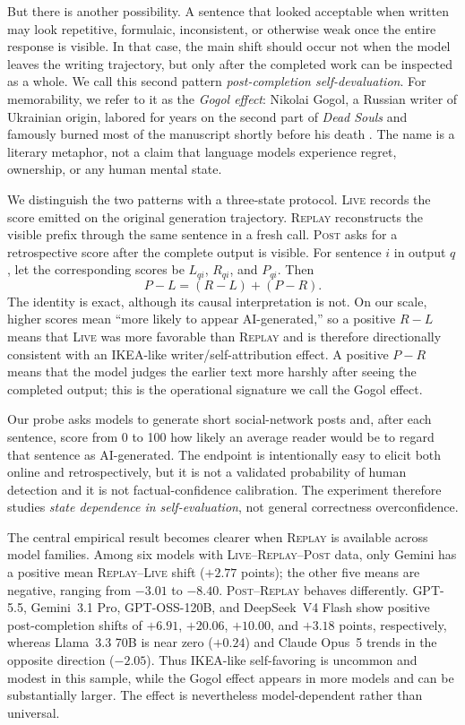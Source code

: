 \documentclass[10pt]{article}
\newcommand{\live}{\textsc{Live}}
\newcommand{\replay}{\textsc{Replay}}
\newcommand{\post}{\textsc{Post}}
\begin{document}
But there is another possibility. A sentence that looked acceptable when written may look repetitive, formulaic, inconsistent, or otherwise weak once the entire response is visible. In that case, the main shift should occur not when the model leaves the writing trajectory, but only after the completed work can be inspected as a whole. We call this second pattern \emph{post-completion self-devaluation}. For memorability, we refer to it as the \emph{Gogol effect}: Nikolai Gogol, a Russian writer of Ukrainian origin, labored for years on the second part of \emph{Dead Souls} and famously burned most of the manuscript shortly before his death \citep{gogolbio}. The name is a literary metaphor, not a claim that language models experience regret, ownership, or any human mental state.

We distinguish the two patterns with a three-state protocol. \live{} records the score emitted on the original generation trajectory. \replay{} reconstructs the visible prefix through the same sentence in a fresh call. \post{} asks for a retrospective score after the complete output is visible. For sentence $i$ in output $q$, let the corresponding scores be $L_{qi}$, $R_{qi}$, and $P_{qi}$. Then
\begin{equation}
P-L=(R-L)+(P-R).
\label{eq:decomp}
\end{equation}
The identity is exact, although its causal interpretation is not. On our scale, higher scores mean ``more likely to appear AI-generated,'' so a positive $R-L$ means that \live{} was more favorable than \replay{} and is therefore directionally consistent with an IKEA-like writer/self-attribution effect. A positive $P-R$ means that the model judges the earlier text more harshly after seeing the completed output; this is the operational signature we call the Gogol effect.

Our probe asks models to generate short social-network posts and, after each sentence, score from 0 to 100 how likely an average reader would be to regard that sentence as AI-generated. The endpoint is intentionally easy to elicit both online and retrospectively, but it is not a validated probability of human detection and it is not factual-confidence calibration. The experiment therefore studies \emph{state dependence in self-evaluation}, not general correctness overconfidence.

The central empirical result becomes clearer when \replay{} is available across model families. Among six models with \live{}--\replay{}--\post{} data, only Gemini has a positive mean \replay{}--\live{} shift ($+2.77$ points); the other five means are negative, ranging from $-3.01$ to $-8.40$. \post{}--\replay{} behaves differently. GPT-5.5, Gemini~3.1 Pro, GPT-OSS-120B, and DeepSeek~V4 Flash show positive post-completion shifts of $+6.91$, $+20.06$, $+10.00$, and $+3.18$ points, respectively, whereas Llama~3.3 70B is near zero ($+0.24$) and Claude Opus~5 trends in the opposite direction ($-2.05$). Thus IKEA-like self-favoring is uncommon and modest in this sample, while the Gogol effect appears in more models and can be substantially larger. The effect is nevertheless model-dependent rather than universal.
\end{document}
